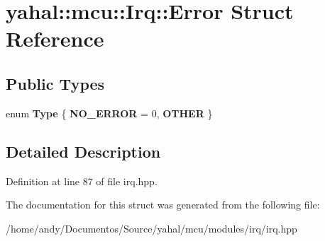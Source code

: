 \hypertarget{structyahal_1_1mcu_1_1_irq_1_1_error}{}\section{yahal\+:\+:mcu\+:\+:Irq\+:\+:Error Struct Reference}
\label{structyahal_1_1mcu_1_1_irq_1_1_error}
\subsection*{Public Types}
\begin{DoxyCompactItemize}
\item 
\hypertarget{structyahal_1_1mcu_1_1_irq_1_1_error_a8c9fff4148f08531ba5cbfe02f60f63d}{}enum {\bfseries Type} \{ {\bfseries N\+O\+\_\+\+E\+R\+R\+O\+R} = 0, 
{\bfseries O\+T\+H\+E\+R}
 \}\label{structyahal_1_1mcu_1_1_irq_1_1_error_a8c9fff4148f08531ba5cbfe02f60f63d}

\end{DoxyCompactItemize}


\subsection{Detailed Description}


Definition at line 87 of file irq.\+hpp.



The documentation for this struct was generated from the following file\+:\begin{DoxyCompactItemize}
\item 
/home/andy/\+Documentos/\+Source/yahal/mcu/modules/irq/irq.\+hpp\end{DoxyCompactItemize}
